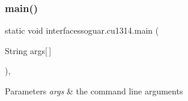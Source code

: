 \subsubsection{\texorpdfstring{main()}{main()}}
{\footnotesize\ttfamily static void interfacessoguar.\+cu1314.\+main (\begin{DoxyParamCaption}\item[{String}]{args\mbox{[}$\,$\mbox{]} }\end{DoxyParamCaption})\hspace{0.3cm}{\ttfamily [inline]}, {\ttfamily [static]}}


\begin{DoxyParams}{Parameters}
{\em args} & the command line arguments \\
\hline
\end{DoxyParams}

